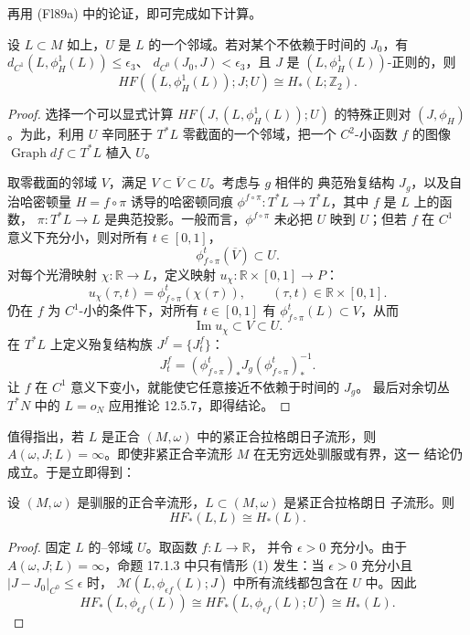 再用 (Fl89a) 中的论证，即可完成如下计算。

\begin{theorem}
\label{thm:local-floer-is-morse}
设 $L\subset M$ 如上，$U$ 是 $L$ 的一个\personDarboux{}邻域。若对某个不依赖于时间的
$J_0$，有
$d_{C^1}(L,\phi_H^1(L))\leq\epsilon_3$、
$d_{C^0}(J_0,J)<\epsilon_3$，且 $J$ 是 $(L,\phi_H^1(L))$-正则的，则
\[
 HF((L,\phi_H^1(L));J;U)\cong H_*(L;\mathbb Z_2).
\]
\end{theorem}

\begin{proof}
选择一个可以显式计算 $HF(J,(L,\phi_H^1(L));U)$ 的特殊正则对
$(J,\phi_H)$。为此，利用 $U$ 辛同胚于 $T^*L$ 零截面的一个邻域，把一个
$C^2$-小\personMorse{}函数 $f$ 的图像 $\operatorname{Graph}df\subset T^*L$ 植入
$U$。

取零截面的邻域 $V$，满足 $V\subset\overline V\subset U$。考虑与 $g$ 相伴的
典范殆复结构 $J_g$，以及自治哈密顿量 $H=f\circ\pi$ 诱导的哈密顿同痕
$\phi^{f\circ\pi}:T^*L\to T^*L$，其中 $f$ 是 $L$ 上的\personMorse{}函数，
$\pi:T^*L\to L$ 是典范投影。一般而言，$\phi^{f\circ\pi}$ 未必把 $U$ 映到
$U$；但若 $f$ 在 $C^1$ 意义下充分小，则对所有 $t\in[0,1]$，
\[
 \phi_{f\circ\pi}^t(\overline V)\subset U.
\]
对每个光滑映射 $\chi:\mathbb R\to L$，定义映射
$u_\chi:\mathbb R\times[0,1]\to P$：
\[
 u_\chi(\tau,t)=\phi_{f\circ\pi}^t(\chi(\tau)),
 \qquad (\tau,t)\in\mathbb R\times[0,1].
\]
仍在 $f$ 为 $C^1$-小的条件下，对所有 $t\in[0,1]$ 有
$\phi_{f\circ\pi}^t(L)\subset V$，从而
\[
 \operatorname{Im}u_\chi\subset V\subset U.
\]
在 $T^*L$ 上定义殆复结构族 $J^f=\{J_t^f\}$：
\[
 J_t^f=(\phi_{f\circ\pi}^t)_*J_g(\phi_{f\circ\pi}^t)_*^{-1}.
\]
让 $f$ 在 $C^1$ 意义下变小，就能使它任意接近不依赖于时间的 $J_g$。
最后对余切丛 $T^*N$ 中的 $L=o_N$ 应用推论 12.5.7，即得结论。
\end{proof}

值得指出，若 $L$ 是正合 $(M,\omega)$ 中的紧正合拉格朗日子流形，则
$A(\omega,J;L)=\infty$。即使非紧正合辛流形 $M$ 在无穷远处驯服或有界，这一
结论仍成立。于是立即得到：

\begin{theorem}
\label{thm:exact-lagrangian-floer-homology}
设 $(M,\omega)$ 是驯服的正合辛流形，$L\subset(M,\omega)$ 是紧正合拉格朗日
子流形。则
\[
 HF_*(L,L)\cong H_*(L).
\]
\end{theorem}

\begin{proof}
固定 $L$ 的\personDarboux{}--\personWeinstein{}邻域 $U$。取\personMorse{}函数 $f:L\to\mathbb R$，
并令 $\epsilon>0$ 充分小。由于 $A(\omega,J;L)=\infty$，命题 17.1.3 中只有情形
(1) 发生：当 $\epsilon>0$ 充分小且 $|J-J_0|_{C^0}\leq\epsilon$ 时，
$\mathcal M(L,\phi_{\epsilon f}(L);J)$ 中所有流线都包含在 $U$ 中。因此
\[
 HF_*(L,\phi_{\epsilon f}(L))
 \cong HF_*(L,\phi_{\epsilon f}(L);U)
 \cong H_*(L).
\]
\end{proof}

